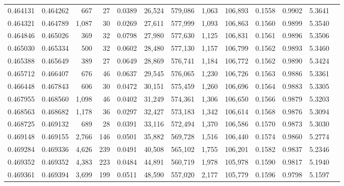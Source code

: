\begin{tabular}{rrrrrrrrrrrrr}
0.464131 & 0.464262 &   667 &    27 &                                     0.0389 &  26,524 & 579,086 &   1,063 & 106,893 & 0.1558 & 0.9902 & 5.3641 \\
0.464321 & 0.464789 & 1,087 &    30 &                                     0.0269 &  27,611 & 577,999 &   1,093 & 106,863 & 0.1560 & 0.9899 & 5.3540 \\
0.464846 & 0.465026 &   369 &    32 &                                     0.0798 &  27,980 & 577,630 &   1,125 & 106,831 & 0.1561 & 0.9896 & 5.3506 \\
0.465030 & 0.465334 &   500 &    32 &                                     0.0602 &  28,480 & 577,130 &   1,157 & 106,799 & 0.1562 & 0.9893 & 5.3460 \\
0.465388 & 0.465649 &   389 &    27 &                                     0.0649 &  28,869 & 576,741 &   1,184 & 106,772 & 0.1562 & 0.9890 & 5.3424 \\
0.465712 & 0.466407 &   676 &    46 &                                     0.0637 &  29,545 & 576,065 &   1,230 & 106,726 & 0.1563 & 0.9886 & 5.3361 \\
0.466448 & 0.467843 &   606 &    30 &                                     0.0472 &  30,151 & 575,459 &   1,260 & 106,696 & 0.1564 & 0.9883 & 5.3305 \\
0.467955 & 0.468560 & 1,098 &    46 &                                     0.0402 &  31,249 & 574,361 &   1,306 & 106,650 & 0.1566 & 0.9879 & 5.3203 \\
0.468563 & 0.468682 & 1,178 &    36 &                                     0.0297 &  32,427 & 573,183 &   1,342 & 106,614 & 0.1568 & 0.9876 & 5.3094 \\
0.468725 & 0.469132 &   689 &    28 &                                     0.0391 &  33,116 & 572,494 &   1,370 & 106,586 & 0.1570 & 0.9873 & 5.3030 \\
0.469148 & 0.469155 & 2,766 &   146 &                                     0.0501 &  35,882 & 569,728 &   1,516 & 106,440 & 0.1574 & 0.9860 & 5.2774 \\
0.469284 & 0.469336 & 4,626 &   239 &                                     0.0491 &  40,508 & 565,102 &   1,755 & 106,201 & 0.1582 & 0.9837 & 5.2346 \\
0.469352 & 0.469352 & 4,383 &   223 &                                     0.0484 &  44,891 & 560,719 &   1,978 & 105,978 & 0.1590 & 0.9817 & 5.1940 \\
0.469361 & 0.469394 & 3,699 &   199 &                                     0.0511 &  48,590 & 557,020 &   2,177 & 105,779 & 0.1596 & 0.9798 & 5.1597 \\

\end{tabular}
